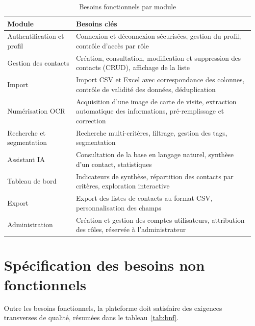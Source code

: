 \begin{table}[H]
\centering
\small
\begin{tabularx}{\textwidth}{|l|X|}
\hline
\textbf{Module} & \textbf{Besoins clés} \\
\hline
Authentification et profil & Connexion et déconnexion sécurisées, gestion du profil, contrôle d'accès par rôle \\
\hline
Gestion des contacts & Création, consultation, modification et suppression des contacts (\acf{CRUD}), affichage de la liste \\
\hline
Import & Import CSV et Excel avec correspondance des colonnes, contrôle de validité des données, déduplication \\
\hline
Numérisation OCR & Acquisition d'une image de carte de visite, extraction automatique des informations, pré-remplissage et correction \\
\hline
Recherche et segmentation & Recherche multi-critères, filtrage, gestion des tags, segmentation \\
\hline
Assistant IA & Consultation de la base en langage naturel, synthèse d'un contact, statistiques \\
\hline
Tableau de bord & Indicateurs de synthèse, répartition des contacts par critères, exploration interactive \\
\hline
Export & Export des listes de contacts au format CSV, personnalisation des champs \\
\hline
Administration & Création et gestion des comptes utilisateurs, attribution des rôles, réservée à l'administrateur \\
\hline
\end{tabularx}
\caption{Besoins fonctionnels par module}
\label{tab:bf-synthese}
\end{table}

\section{Spécification des besoins non fonctionnels}

Outre les besoins fonctionnels, la plateforme doit satisfaire des exigences transverses de qualité, résumées dans le tableau~\ref{tab:bnf}.

